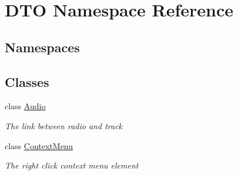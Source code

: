 \hypertarget{namespace_d_t_o}{}\section{D\+TO Namespace Reference}
\label{namespace_d_t_o}
\subsection*{Namespaces}
\begin{DoxyCompactItemize}
\end{DoxyCompactItemize}
\subsection*{Classes}
\begin{DoxyCompactItemize}
\item 
class \hyperlink{class_d_t_o_1_1_audio}{Audio}
\begin{DoxyCompactList}\small\item\em The link between radio and track \end{DoxyCompactList}\item 
class \hyperlink{class_d_t_o_1_1_context_menu}{Context\+Menu}
\begin{DoxyCompactList}\small\item\em The right click context menu element \end{DoxyCompactList}\end{DoxyCompactItemize}
